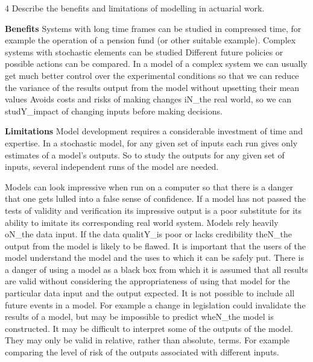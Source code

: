 \documentclass[a4paper,12pt]{article}
\begin{document}
4 Describe the benefits and limitations of modelling in actuarial work.

\noindent \textbf{Benefits}
Systems with long time frames can be studied in compressed time,
for example the operation of a pension fund (or other suitable example).
Complex systems with stochastic elements can be studied Different future policies or possible actions can be compared.
In a model of a complex system we can usually get much better control over the experimental conditions so that we can reduce the variance of the results output from the model without upsetting their mean values
Avoids costs and risks of making changes iN_the real world, so we can studY_impact of changing inputs before making decisions.

\noindent \textbf{Limitations}
Model development requires a considerable investment of time and expertise.
In a stochastic model, for any given set of inputs each run gives only estimates of a model’s outputs. So to study the outputs for any given set of inputs, several independent runs of the model are needed.

Models can look impressive when run on a computer so that there is a danger that one gets lulled into a false sense of confidence.
If a model has not passed the tests of validity and verification its impressive output is a poor substitute for its ability to imitate its corresponding real world system.
Models rely heavily oN_the data input. If the data qualitY_is poor or lacks credibility theN_the output from the model is likely to be flawed.
It is important that the users of the model understand the model and the uses to which it can be safely put. There is a danger of using a model as a black box from which it is assumed that all results are valid without considering the appropriateness of using that
model for the particular data input and the output expected.
It is not possible to include all future events in a model. For example a change in legislation could invalidate the results of a model, but may be impossible to predict wheN_the model is constructed. It may be difficult to interpret some of the outputs of the model. They may only be valid in relative, rather than absolute, terms. For example comparing the level of risk
of the outputs associated with different inputs.

\end{document}
